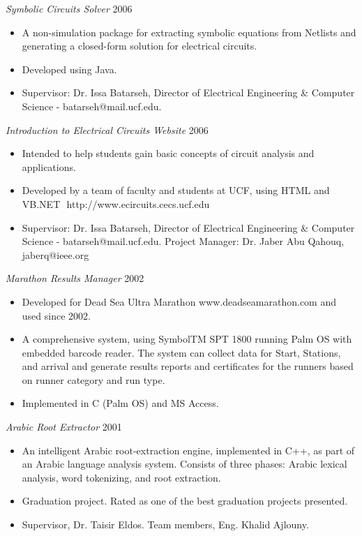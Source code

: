 \documentclass[line,margin]{res}
\begin{document}
\begin{resume}
{\sl Symbolic Circuits Solver } \hfill   2006 \\
\begin{itemize} \itemsep -2pt
     \item A non-simulation package for extracting symbolic equations from
      Netlists and generating a closed-form solution for electrical circuits.
     \item Developed using Java.
     \item Supervisor: Dr. Issa Batarseh, Director of Electrical Engineering \&
     Computer Science - batarseh@mail.ucf.edu.
\end{itemize}

{\sl Introduction to Electrical Circuits Website} \hfill   2006 \\
\begin{itemize} \itemsep -2pt
     \item Intended to help students gain basic concepts of circuit analysis and
     applications.
     \item Developed by a team of faculty and students at UCF, using
     HTML and VB.NET  http://www.ecircuits.cecs.ucf.edu
     \item Supervisor: Dr. Issa Batarseh, Director of Electrical
     Engineering \& Computer Science - batarseh@mail.ucf.edu. Project Manager:
     Dr. Jaber Abu Qahouq, jaberq@ieee.org
\end{itemize}

{\sl Marathon Results Manager} \hfill   2002 \\
\begin{itemize} \itemsep -2pt
     \item Developed for Dead Sea Ultra Marathon www.deadseamarathon.com and
     used since 2002.
     \item A comprehensive system, using SymbolTM SPT 1800 running Palm OS with
     embedded barcode reader. The system can collect data for Start, Stations,
     and arrival and generate results reports and certificates for the runners
     based on runner category and run type.
     \item Implemented in C (Palm OS) and MS Access.
\end{itemize}

{\sl Arabic Root Extractor} \hfill   2001 \\
\begin{itemize} \itemsep -2pt
     \item An intelligent Arabic root-extraction engine, implemented in C++, as
     part of an Arabic language analysis system. Consists of three phases:
     Arabic lexical analysis, word tokenizing, and root extraction.
     \item Graduation project. Rated as one of the best graduation projects
     presented.
     \item Supervisor, Dr. Taisir Eldos. Team members, Eng. Khalid Ajlouny.
\end{itemize}


\end{resume}
\end{document}
